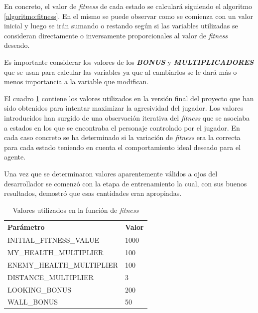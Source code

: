 \bigskip

En concreto, el valor de \textit{fitness} de cada estado se calculará siguiendo el algoritmo \ref{algoritmo:fitness}. En el mismo se puede observar como se comienza con un valor inicial y luego se irán sumando o restando según si las variables utilizadas se consideran directamente o inversamente proporcionales al valor de \textit{fitness} deseado.

\bigskip

Es importante considerar los valores de los \textbf{\textit{BONUS}} y \textbf{\textit{MULTIPLICADORES}} que se usan para calcular las variables ya que al cambiarlos se le dará más o menos importancia a la variable que modifican.

\bigskip

El cuadro \ref{algoritmo:valores} contiene los valores utilizados en la versión final del proyecto que han sido obtenidos para intentar maximizar la agresividad del jugador. Los valores introducidos han surgido de una observación iterativa del \textit{fitness} que se asociaba a estados en los que se encontraba el personaje controlado por el jugador. En cada caso concreto se ha determinado si la variación de \textit{fitness} era la correcta para cada estado teniendo en cuenta el comportamiento ideal deseado para el agente.

\bigskip

Una vez que se determinaron valores aparentemente válidos a ojos del desarrollador se comenzó con la etapa de entrenamiento la cual, con sus buenos resultados, demostró que esas cantidades eran apropiadas.

\bigskip

\begin{table}
	\begin{center}
		\begin{tabular}{|l|l|}
			\hline
			\textbf{Parámetro} & \textbf{Valor}\\
			
			\hline
			INITIAL\_FITNESS\_VALUE& 1000\\
			
			\hline
			MY\_HEALTH\_MULTIPLIER& 100\\
			
			\hline
			ENEMY\_HEALTH\_MULTIPLIER& 100\\
			
			\hline
			DISTANCE\_MULTIPLIER& 3\\
			
			\hline
			LOOKING\_BONUS& 200\\
			
			\hline
			WALL\_BONUS& 50\\
			
			\hline
		\end{tabular}
		\caption{Valores utilizados en la función de \textit{fitness}}
		\label{algoritmo:valores}
	\end{center}
\end{table}


